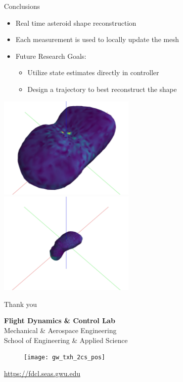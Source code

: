 \documentclass[11pt,professionalfonts]{beamer}
\begin{document}
\begin{frame}{Conclusions}
    \begin{itemize}
        \item Real time asteroid shape reconstruction 
        \item Each measurement is used to locally update the mesh
        \item Future Research Goals:
            \begin{itemize}
                \item Utilize state estimates directly in controller
                \item Design a trajectory to best reconstruct the shape
            \end{itemize}
    \end{itemize} 

    \begin{center}
        \includegraphics[width=0.5\textwidth,keepaspectratio]{figures/castalia/final_az=45_el=30.jpg}~
        \includegraphics[width=0.5\textwidth, keepaspectratio]{figures/itokawa/final_az=45_el=30.jpg}
    \end{center}
\end{frame}

\begin{frame}[c]{Thank you}
  \centering
  
  \textbf{\large Flight Dynamics \& Control Lab} \\
  Mechanical \& Aerospace Engineering \\
  School of Engineering \& Applied Science
  
  \begin{figure} %
        \texttt{[image: gw\_txh\_2cs\_pos]}
    \end{figure}
  
  \url{https://fdcl.seas.gwu.edu}
\end{frame}
\end{document}

